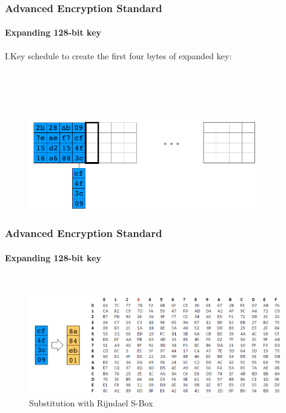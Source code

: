 \begin{frame}
	\frametitle{Advanced Encryption Standard}
	\framesubtitle{Expanding 128-bit key}
	{\normalsize
    {I.Key schedule to create the first four bytes of expanded key:}\\
    \hspace{0.4cm}{I.1.Create a 4-byte temporary variable $t$.}\\
    \hspace{0.4cm}{I.2.Assign the value of the previous four bytes in the temporary}\\
    \hspace{0.4cm}{key to $t$.}\\
    \hspace{0.4cm}{I.3.Rotate one byte to the left.}\\
	}
	\begin{figure}
		\vfill
		\centering
		\includegraphics[width=10cm]{keysch2}
		\label{fig:obrazek keysch2}
	\end{figure}
\end{frame}

\begin{frame}
	\frametitle{Advanced Encryption Standard}
	\framesubtitle{Expanding 128-bit key}
	{\normalsize
	\hspace{0.4cm}{I.4.Substitute bytes on $t$ with Rijndael S-Box.}\\
	}
	\begin{figure}
		\vfill
		\centering
		\includegraphics[width=11cm]{keysub}
		\caption{Substitution with Rijndael S-Box}
		\label{fig:obrazek keysub}
	\end{figure}
\end{frame}


